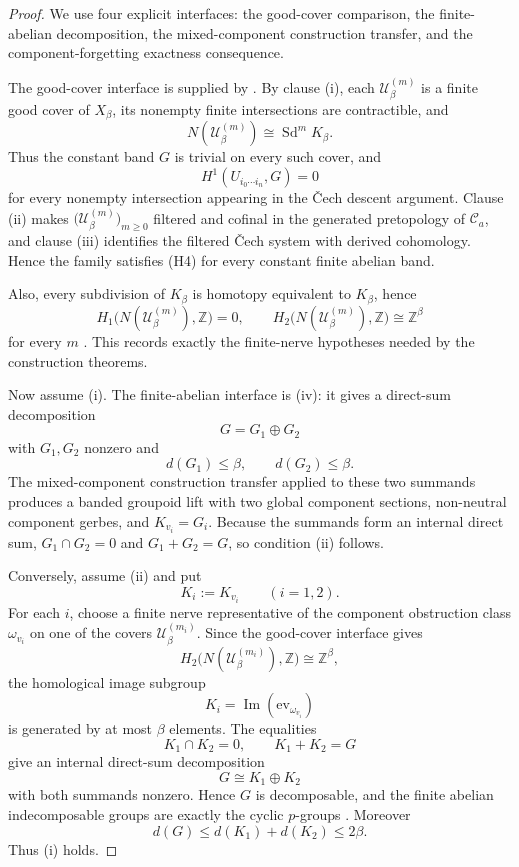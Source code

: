 \begin{proof}
We use four explicit interfaces: the good-cover comparison, the
finite-abelian decomposition, the mixed-component construction transfer, and the
component-forgetting exactness consequence.

The good-cover interface is supplied by
. By clause \textup{(i)},
each $\mathcal U_\beta^{(m)}$ is a finite good cover of $X_\beta$, its
nonempty finite intersections are contractible, and
\[
N(\mathcal U_\beta^{(m)})\cong \operatorname{Sd}^{m}K_\beta.
\]
Thus the constant band $G$ is trivial on every such cover, and
\[
H^1(U_{i_0\cdots i_n},G)=0
\]
for every nonempty intersection appearing in the \v{C}ech descent
argument. Clause \textup{(ii)} makes
$\bigl(\mathcal U_\beta^{(m)}\bigr)_{m\ge 0}$ filtered and cofinal in the
generated pretopology of $\mathcal C_a$, and clause \textup{(iii)}
identifies the filtered \v{C}ech system with derived cohomology. Hence
the family satisfies \textup{(H4)} for every constant finite abelian band.

Also, every subdivision of $K_\beta$ is homotopy equivalent to $K_\beta$, hence
\[
H_1\bigl(N(\mathcal U_\beta^{(m)}),\mathbb Z\bigr)=0,
\qquad
H_2\bigl(N(\mathcal U_\beta^{(m)}),\mathbb Z\bigr)\cong \mathbb Z^\beta
\]
for every $m$ \cite[Secs.~2.1, 2.2]{Hatcher2002}. This records exactly
the finite-nerve hypotheses needed by the construction theorems.

Now assume \textup{(i)}. The finite-abelian interface is
(iv): it gives a direct-sum
decomposition
\[
G=G_1\oplus G_2
\]
with $G_1,G_2$ nonzero and
\[
d(G_1)\le\beta,
\qquad
d(G_2)\le\beta.
\]
The mixed-component construction transfer
 applied to these two
summands produces a banded groupoid lift with two global component sections, non-neutral
component gerbes, and $K_{v_i}=G_i$. Because the summands form an
internal direct sum, $G_1\cap G_2=0$ and $G_1+G_2=G$, so condition
\textup{(ii)} follows.

Conversely, assume \textup{(ii)} and put
\[
K_i:=K_{v_i}
\qquad
(i=1,2).
\]
For each $i$, choose a finite nerve representative of the component obstruction class $\omega_{v_i}$ on one of the covers $\mathcal U_\beta^{(m_i)}$. Since the good-cover interface gives
\[
H_2\bigl(N(\mathcal U_\beta^{(m_i)}),\mathbb Z\bigr)\cong \mathbb Z^\beta,
\]
the homological image subgroup
\[
K_i=\operatorname{Im}(\mathrm{ev}_{\omega_{v_i}})
\]
is generated by at most $\beta$ elements. The equalities
\[
K_1\cap K_2=0,
\qquad
K_1+K_2=G
\]
give an internal direct-sum decomposition
\[
G\cong K_1\oplus K_2
\]
with both summands nonzero. Hence $G$ is decomposable, and the finite abelian indecomposable groups are exactly the cyclic $p$-groups \cite[Chap.~12]{DummitFoote2004}. Moreover
\[
d(G)\le d(K_1)+d(K_2)\le 2\beta.
\]
Thus \textup{(i)} holds.


\end{proof}
